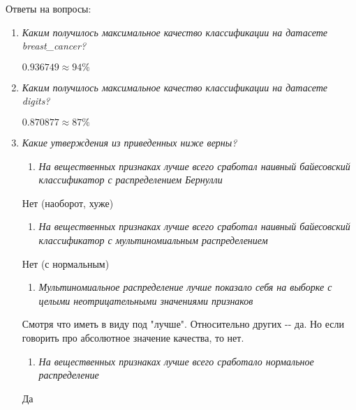 \documentclass[11pt]{article}
\providecommand{\tightlist}{%
      \setlength{\itemsep}{0pt}\setlength{\parskip}{0pt}}
\begin{document}
    Ответы на вопросы:

\begin{enumerate}
\def\labelenumi{\arabic{enumi}.}
\item
  \emph{Каким получилось максимальное качество классификации на датасете
  breast\_cancer?}

  \(0.936749 \approx 94\%\)
\item
  \emph{Каким получилось максимальное качество классификации на датасете
  digits?}

  \(0.870877\approx 87 \%\)
\item
  \emph{Какие утверждения из приведенных ниже верны?}

  \begin{enumerate}
  \def\labelenumii{(\alph{enumii})}
  \tightlist
  \item
    \emph{На вещественных признаках лучше всего сработал наивный
    байесовский классификатор с распределением Бернулли}
  \end{enumerate}

  Нет (наоборот, хуже)

  \begin{enumerate}
  \def\labelenumii{(\alph{enumii})}
  \setcounter{enumii}{1}
  \tightlist
  \item
    \emph{На вещественных признаках лучше всего сработал наивный
    байесовский классификатор с мультиномиальным распределением}
  \end{enumerate}

  Нет (с нормальным)

  \begin{enumerate}
  \def\labelenumii{(\alph{enumii})}
  \setcounter{enumii}{2}
  \tightlist
  \item
    \emph{Мультиномиальное распределение лучше показало себя на выборке
    с целыми неотрицательными значениями признаков}
  \end{enumerate}

  Смотря что иметь в виду под "лучше". Относительно других -\/- да. Но
  если говорить про абсолютное значение качества, то нет.

  \begin{enumerate}
  \def\labelenumii{(\alph{enumii})}
  \setcounter{enumii}{3}
  \tightlist
  \item
    \emph{На вещественных признаках лучше всего сработало нормальное
    распределение}
  \end{enumerate}

  Да
\end{enumerate}
\end{document}
